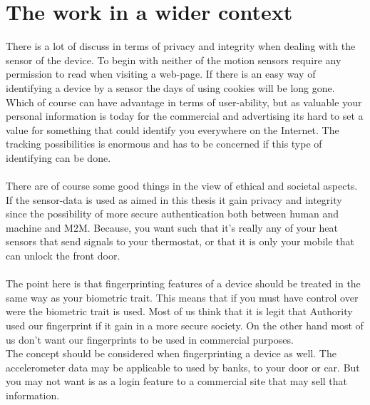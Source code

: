 \section{The work in a wider context}\label{sec:ethical}
There is a lot of discuss in terms of privacy and integrity when dealing with the sensor of the device. To begin with neither of the motion sensors require any permission to read when visiting a web-page. If there is an easy way of identifying a device by a sensor the days of using cookies will be long gone. Which of course can have advantage in terms of user-ability, but as valuable your personal information is today for the commercial and advertising its hard to set a value for something that could identify you everywhere on the Internet. The tracking possibilities is enormous and has to be concerned if this type of identifying can be done. \\
\\
There are of course some good things in the view of ethical and societal aspects. If the sensor-data is used as aimed in this thesis it gain  privacy and integrity since the possibility of more secure authentication both between human and machine and M2M. Because, you want such that it's really any of your heat sensors that send signals to your thermostat, or that it is only your mobile that can unlock the front door.\\
\\
The point here is that fingerprinting features of a device should be treated in the same way as your biometric trait. This means that if you must have control over were the biometric trait is used. Most of us think that it is legit that Authority used our fingerprint if it gain in a more secure society. On the other hand most of us don't want our fingerprints to be used in commercial purposes. \\
The concept should be considered when fingerprinting a device as well. The accelerometer data may be applicable to used by banks, to your door or car. But you may not want is as a login feature to a commercial site that may sell that information.


